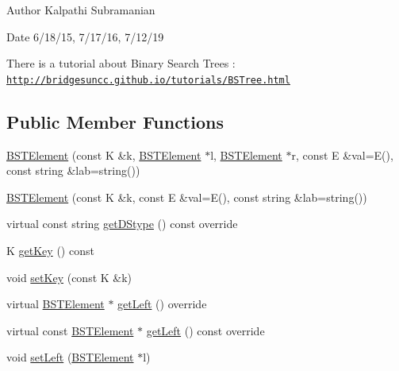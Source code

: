 \begin{DoxyAuthor}{Author}
Kalpathi Subramanian 
\end{DoxyAuthor}
\begin{DoxyDate}{Date}
6/18/15, 7/17/16, 7/12/19
\end{DoxyDate}
There is a tutorial about Binary Search Trees \+: \href{http://bridgesuncc.github.io/tutorials/BSTree.html}{\tt http\+://bridgesuncc.\+github.\+io/tutorials/\+B\+S\+Tree.\+html} \subsection*{Public Member Functions}
\begin{DoxyCompactItemize}
\item 
\hyperlink{classbridges_1_1datastructure_1_1_b_s_t_element_a861caf985c223a9a848082fd5a4974fd}{B\+S\+T\+Element} (const K \&k, \hyperlink{classbridges_1_1datastructure_1_1_b_s_t_element}{B\+S\+T\+Element} $\ast$l, \hyperlink{classbridges_1_1datastructure_1_1_b_s_t_element}{B\+S\+T\+Element} $\ast$r, const E \&val=E(), const string \&lab=string())
\item 
\hyperlink{classbridges_1_1datastructure_1_1_b_s_t_element_a839372e61dd261d3fd7df1d22dd0a5dd}{B\+S\+T\+Element} (const K \&k, const E \&val=E(), const string \&lab=string())
\item 
virtual const string \hyperlink{classbridges_1_1datastructure_1_1_b_s_t_element_a2bb8cc9ec4b6bc5b89ecef0f17be366f}{get\+D\+Stype} () const override
\item 
K \hyperlink{classbridges_1_1datastructure_1_1_b_s_t_element_a66bd1d5874e4e0c8048e03e5fff07f86}{get\+Key} () const
\item 
void \hyperlink{classbridges_1_1datastructure_1_1_b_s_t_element_a06d80480736ae19052e2d1bc6345323a}{set\+Key} (const K \&k)
\item 
virtual \hyperlink{classbridges_1_1datastructure_1_1_b_s_t_element}{B\+S\+T\+Element} $\ast$ \hyperlink{classbridges_1_1datastructure_1_1_b_s_t_element_af863c624691c11db26ae3b6d723d1f5c}{get\+Left} () override
\item 
virtual const \hyperlink{classbridges_1_1datastructure_1_1_b_s_t_element}{B\+S\+T\+Element} $\ast$ \hyperlink{classbridges_1_1datastructure_1_1_b_s_t_element_abac324ef0b480420bd82ecfe4501d60d}{get\+Left} () const override
\item 
void \hyperlink{classbridges_1_1datastructure_1_1_b_s_t_element_a5810ed79b697d691f4d8a75c2f9b639f}{set\+Left} (\hyperlink{classbridges_1_1datastructure_1_1_b_s_t_element}{B\+S\+T\+Element} $\ast$l)

\end{DoxyCompactItemize}
